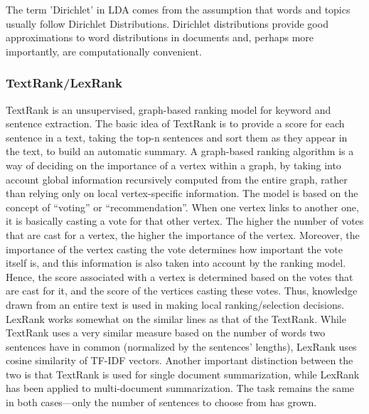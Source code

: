 \documentclass[journal]{IEEEtran}
\begin{document}
The term 'Dirichlet' in LDA comes from the assumption that words and topics usually follow Dirichlet Distributions. Dirichlet distributions provide good approximations to word distributions in documents and, perhaps more importantly, are computationally convenient.
\vspace{0.5cm}

\subsubsection{TextRank/LexRank}
TextRank is an unsupervised, graph-based ranking model for keyword and sentence extraction. The basic idea of TextRank is to provide a score for each sentence in a text, taking the top-n sentences and sort them as they appear in the text, to build an automatic summary. A graph-based ranking algorithm is a way of deciding on the importance of a vertex within a graph, by taking into account global information recursively computed from the entire graph, rather than relying only on local vertex-specific information. The model is based on the concept of “voting” or “recommendation”. When one vertex links to another one, it is basically casting a vote for that other vertex. The higher the number of votes that are cast for a vertex, the higher the importance of the vertex. Moreover, the importance of the vertex casting the vote determines how important the vote itself is, and this information is also taken into account by the ranking model. Hence, the score associated with a vertex is determined based on the votes that are cast for it, and the score of the vertices casting these votes. Thus, knowledge drawn from an entire text is used in making local ranking/selection decisions. 
LexRank works somewhat on the similar lines as that of the TextRank. While TextRank uses a very similar measure based on the number of words two sentences have in common (normalized by the sentences' lengths), LexRank uses cosine similarity of TF-IDF vectors. Another important distinction between the two is that TextRank is used for single document summarization, while LexRank has been applied to multi-document summarization. The task remains the same in both cases—only the number of sentences to choose from has grown.
\vspace{0.5cm}
\end{document}
